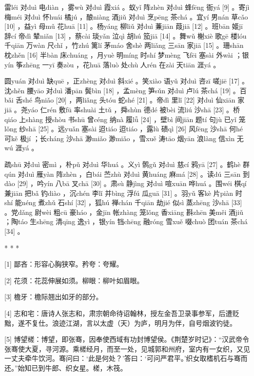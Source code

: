\documentclass[12pt,UTF8]{ctexbook}
\begin{document}
雷léi 对duì 电diàn ，雾wù 对duì 霞xiá 。蚁yǐ 阵zhèn 对duì 蜂fēng 衙yá [9] 。寄jì 梅méi 对duì 怀huái 橘jú ，酿niàng 酒jiǔ 对duì 烹pēng 茶chá 。宜yí 男nán 草cǎo [10] ，益yì 母mǔ 花huā [11] 。杨yáng 柳liǔ 对duì 蒹jiān 葭jiā [12] 。班bān 姬jī 辞cí 帝dì 辇niǎn [13] ，蔡cài 琰yǎn 泣qì 胡hú 笳jiā [14] 。舞wǔ 榭xiè 歌gē 楼lóu 千qiān 万wàn 尺chǐ ，竹zhú 篱lí 茅máo 舍shè 两liǎng 三sān 家jiā [15] 。珊shān 枕zhěn [16] 半bàn 床chuáng ，月yuè 明míng 时shí 梦mèng 飞fēi 塞sài 外wài ；银yín 筝zhēng 一yī 奏zòu ，花huā 落luò 处chù 人rén 在zài 天tiān 涯yá 。

圆yuán 对duì 缺quē ，正zhèng 对duì 斜xié 。笑xiào 语yǔ 对duì 咨zī 嗟jiē [17] 。沈shěn 腰yāo 对duì 潘pān 鬓bìn [18] ，孟mèng 笋sǔn 对duì 卢lú 茶chá [19] 。百bǎi 舌shé 鸟niǎo [20] ，两liǎng 头tóu 蛇shé [21] 。帝dì 里lǐ [22] 对duì 仙xiān 家jiā 。尧yáo 仁rén 敷fū 率shuài 土tǔ ，舜shùn 德dé 被bèi 流liú 沙shā [23] 。桥qiáo 上shàng 授shòu 书shū 曾céng 纳nà 履lǚ [24] ，壁bì 间jiān 题tí 句jù 已yǐ 笼lǒng 纱shā [25] 。远yuǎn 塞sài 迢tiáo 迢tiáo ，露lù 碛qì [26] 风fēng 沙shā 何hé 可kě 极jí ；长cháng 沙shā 渺miǎo 渺miǎo ，雪xuě 涛tāo 烟yān 浪làng 信xìn 无wú 涯yá 。

疏shū 对duì 密mì ，朴pǔ 对duì 华huá 。义yì 鹘gǔ 对duì 慈cí 鸦yā [27] 。鹤hè 群qún 对duì 雁yàn 阵zhèn ，白bái 苎zhù 对duì 黄huáng 麻má [28] 。读dú 三sān 到dào [29] ，吟yín 八bā 叉chā [30] 。肃sù 静jìng 对duì 喧xuān 哗huá 。围wéi 棋qí 兼jiān 把bǎ 钓diào ，沉chén 李lǐ 并bìng 浮fú 瓜guā [31] 。羽yǔ 客kè 片piàn 时shí 能néng 煮zhǔ 石shí [32] ，狐hú 禅chán 千qiān 劫jié 似sì 蒸zhēng 沙shā [33] 。党dǎng 尉wèi 粗cū 豪háo ，金jīn 帐zhàng 笼lǒng 香xiāng 斟zhēn 美měi 酒jiǔ ；陶táo 生shēng 清qīng 逸yì ，银yín 铛chēng 融róng 雪xuě 啜chuò 团tuán 茶chá [34] 。



* * *



[1] 鄙吝：形容心胸狭窄。矜夸：夸耀。

[2] 花须：花蕊伸展如须。柳眼：柳叶如眉眼。

[3] 檐牙：檐际翘出如牙的部分。

[4] 志和宅：唐诗人张志和，肃宗朝命待诏翰林，授左金吾卫录事参军，后遭贬黜，遂不复仕。浪迹江湖，言以太虚（天）为庐，明月为伴，自号烟波钓徒。

[5] 博望槎：博望，即张骞，因奉使西域有功封博望侯。《荆楚岁时记》：“汉武帝令张骞使大夏，寻河源。乘槎经月，而至一处，见城郭和州府，室内有一女织，又见一丈夫牵牛饮河。骞问曰：‘此是何处？’答曰：‘可问严君平。’织女取榰机石与骞而还。”始知已到牛郎、织女星。槎，木筏。
\end{document}

